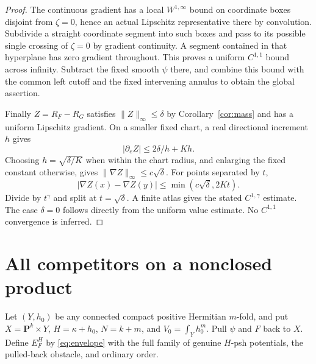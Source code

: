 \documentclass[11pt]{article}
\theoremstyle{remark}\newtheorem{remark}[theorem]{Remark}
\begin{document}
\begin{proof}
The continuous gradient has a local $W^{1,\infty}$ bound on
coordinate boxes disjoint from $\zeta=0$, hence an actual Lipschitz
representative there by convolution. Subdivide a straight coordinate
segment into such boxes and pass to its possible single crossing of
$\zeta=0$ by gradient continuity. A segment contained in that
hyperplane has zero gradient throughout. This proves a uniform
$C^{1,1}$ bound across infinity. Subtract the fixed smooth $\psi$
there, and combine this bound with the common left cutoff and the
fixed intervening annulus to obtain the global assertion.

Finally $Z=R_F-R_G$ satisfies $\|Z\|_\infty\le\delta$ by
Corollary~\ref{cor:mass} and has a uniform Lipschitz gradient.
On a smaller fixed chart, a real directional increment $h$ gives
\[
 |\partial_e Z|\le2\delta/h+K h.
\]
Choosing $h=\sqrt{\delta/K}$ when within the chart radius, and
enlarging the fixed constant otherwise, gives
$\|\nabla Z\|_\infty\le c\sqrt\delta$.
For points separated by $t$,
\[
 |\nabla Z(x)-\nabla Z(y)|\le
             \min(c\sqrt\delta,2Kt).
\]
Divide by $t^\gamma$ and split at $t=\sqrt\delta$.
A finite atlas gives the stated $C^{1,\gamma}$ estimate.
The case $\delta=0$ follows directly from the uniform value estimate.
No $C^{1,1}$ convergence is inferred.
\end{proof}

\section{All competitors on a nonclosed product}
Let $(Y,h_0)$ be any connected compact positive Hermitian $m$-fold,
and put $X=\mathbf P^k\times Y$, $H=\kappa+h_0$,
$N=k+m$, and $V_0=\int_Yh_0^m$. Pull $\psi$ and $F$ back to $X$.
Define $E_F^H$ by \eqref{eq:envelope} with the full family of genuine
$H$-psh potentials, the pulled-back obstacle, and ordinary order.
\end{document}
